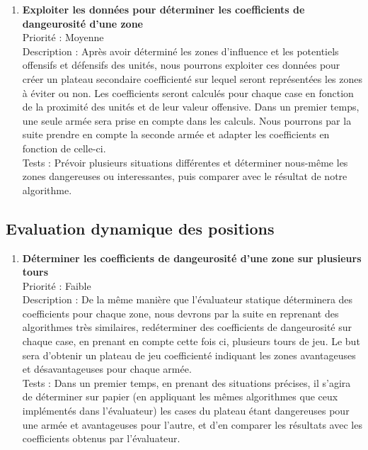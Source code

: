 \documentclass[12pt]{article}
\begin{document}
\begin{enumerate}
				\item \textbf{Exploiter les données pour déterminer les coefficients de dangeurosité d'une zone} 
				\\[0.7\baselineskip]
				Priorité : Moyenne 
				\\[0.7\baselineskip]
				Description : Après avoir déterminé les zones d'influence et les potentiels offensifs et défensifs des unités, nous pourrons exploiter ces données pour 
				créer un plateau secondaire coefficienté sur lequel seront représentées les zones à éviter ou non. Les coefficients seront calculés pour chaque case en 
				fonction de la proximité des unités et de leur valeur offensive. Dans un premier temps, une seule armée sera prise en compte dans les calculs. Nous pourrons 
				par la suite prendre en compte la seconde armée et adapter les coefficients en fonction de celle-ci. 
				\\[0.7\baselineskip]
				Tests : Prévoir plusieurs situations différentes et déterminer nous-même les zones dangereuses ou interessantes, puis comparer 
				avec le résultat de notre algorithme. 
				\\[0.7\baselineskip]
				
			\end{enumerate}

		\subsection{Evaluation dynamique des positions}

			\begin{enumerate}

				\item \textbf{Déterminer les coefficients de dangeurosité d'une zone sur plusieurs tours} 
				\\[0.7\baselineskip]
				Priorité : Faible 
				\\[0.7\baselineskip]
				Description : De la même manière que l'évaluateur statique déterminera des coefficients pour chaque zone, nous devrons par la suite en reprenant des 
				algorithmes très similaires, redéterminer des coefficients de dangeurosité sur chaque case, en prenant en compte cette fois ci, plusieurs tours de jeu. 
				Le but sera d'obtenir un plateau de jeu coefficienté indiquant les zones avantageuses et désavantageuses pour chaque armée. 
				\\[0.7\baselineskip]
				Tests : Dans un premier temps, en prenant des situations précises, il s'agira de déterminer sur papier (en appliquant les mêmes algorithmes que ceux 
				implémentés dans l'évaluateur) les cases du plateau étant dangereuses pour une armée et avantageuses pour l'autre, et d'en comparer les résultats avec 
				les coefficients obtenus par l'évaluateur. 
				\\[0.7\baselineskip]
				
			\end{enumerate}
\end{document}

